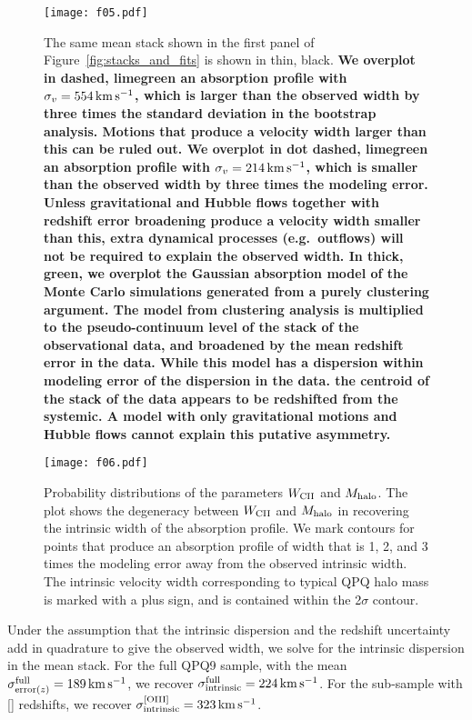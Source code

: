 \documentclass[iop]{emulateapj}
\begin{document}
\begin{figure}
\texttt{[image: f05.pdf]}
\caption{The same  mean stack shown in the first panel of
Figure~\ref{fig:stacks_and_fits} is shown in thin, black.
{\bf We overplot in dashed, limegreen an
absorption profile with $\sigma_v=554\,{\rm km\,s^{-1}}$, which is larger than the observed width
by three times the standard deviation in the bootstrap analysis. Motions that produce a velocity
width larger than this can be ruled out. We overplot in dot dashed, limegreen an absorption profile with
$\sigma_v=214\,{\rm km\,s^{-1}}$, which is smaller than the observed width by three times the
modeling error. Unless gravitational and Hubble flows together with redshift error broadening
produce a velocity width smaller than this, extra dynamical processes (e.g.\ outflows) will not be
required to explain the observed width.
In thick, green, we overplot the
Gaussian absorption model of the Monte Carlo simulations generated from a purely clustering
argument. The model from clustering analysis is multiplied to the pseudo-continuum level of the
stack of the observational data, and broadened
by the mean redshift error in the data. While this model has a dispersion within modeling error of the
dispersion in the data. the centroid of the stack of the data appears to be redshifted
from the systemic. A model with only gravitational motions and Hubble flows cannot explain
this putative asymmetry.}
}
\label{fig:monte}
\end{figure}

\begin{figure}
\texttt{[image: f06.pdf]}
\caption{
Probability distributions of the parameters $W_{\rm CII}$ and $M_{\rm halo}$. The plot shows the
degeneracy between $W_{\rm CII}$ and $M_{\rm halo}$ in recovering the intrinsic width of the
absorption profile. We mark contours for points that produce an absorption
profile of width that is 1, 2, and 3 times the modeling error away from the observed intrinsic
width. The intrinsic velocity width corresponding to typical QPQ halo mass is marked with a plus
sign, and is contained within the 2$\sigma$ contour.}
\label{fig:contour}
\end{figure}

Under the assumption that the intrinsic dispersion and the redshift uncertainty add in
quadrature to give the observed width, we solve for the intrinsic dispersion in the 
mean stack. For the full QPQ9 sample, with the mean
$\sigma_{{\rm error}(z)}^{\rm full}=189\,{\rm km\,s^{-1}}$, we recover
$\sigma_{\rm intrinsic}^{\rm full}=224\,{\rm km\,s^{-1}}$. For the sub-sample with []
redshifts, we recover $\sigma_{\rm intrinsic}^{\rm [OIII]}=323\,{\rm km\,s^{-1}}$.
\end{document}
